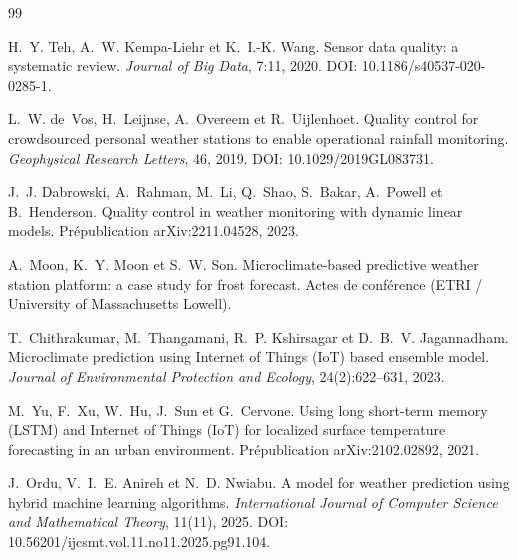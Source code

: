 \documentclass[12pt,a4paper]{report}
\begin{document}
\begin{thebibliography}{99}

H.~Y. Teh, A.~W. Kempa-Liehr et K.~I.-K. Wang.
\newblock Sensor data quality: a systematic review.
\newblock \textit{Journal of Big Data}, 7:11, 2020.
\newblock DOI: 10.1186/s40537-020-0285-1.

L.~W. de~Vos, H.~Leijnse, A.~Overeem et R.~Uijlenhoet.
\newblock Quality control for crowdsourced personal weather stations to enable
operational rainfall monitoring.
\newblock \textit{Geophysical Research Letters}, 46, 2019.
\newblock DOI: 10.1029/2019GL083731.

J.~J. Dabrowski, A.~Rahman, M.~Li, Q.~Shao, S.~Bakar, A.~Powell et B.~Henderson.
\newblock Quality control in weather monitoring with dynamic linear models.
\newblock Prépublication arXiv:2211.04528, 2023.

A.~Moon, K.~Y. Moon et S.~W. Son.
\newblock Microclimate-based predictive weather station platform: a case study
for frost forecast.
\newblock Actes de conférence (ETRI / University of Massachusetts Lowell).
\newblock %

T.~Chithrakumar, M.~Thangamani, R.~P. Kshirsagar et D.~B.~V. Jagannadham.
\newblock Microclimate prediction using Internet of Things (IoT) based ensemble
model.
\newblock \textit{Journal of Environmental Protection and Ecology}, 24(2):622--631,
2023.

M.~Yu, F.~Xu, W.~Hu, J.~Sun et G.~Cervone.
\newblock Using long short-term memory (LSTM) and Internet of Things (IoT) for
localized surface temperature forecasting in an urban environment.
\newblock Prépublication arXiv:2102.02892, 2021.

J.~Ordu, V.~I.~E. Anireh et N.~D. Nwiabu.
\newblock A model for weather prediction using hybrid machine learning
algorithms.
\newblock \textit{International Journal of Computer Science and Mathematical
Theory}, 11(11), 2025.
\newblock DOI: 10.56201/ijcsmt.vol.11.no11.2025.pg91.104.

\end{thebibliography}

\cleardoublepage
\tableofcontents
\end{document}
